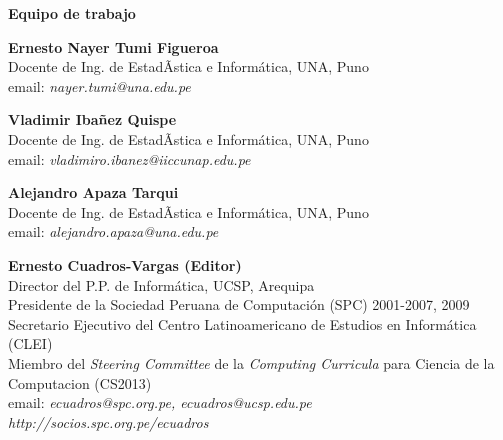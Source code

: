 \begin{center}
{\bf \Huge Equipo de trabajo}
\end{center}
\vspace{1cm}

\begin{center}
\textbf{Ernesto Nayer Tumi Figueroa}\\
Docente de Ing. de EstadÃ­stica e Informática, UNA, Puno\\
email: \textit{nayer.tumi@una.edu.pe}\\
\end{center}

\begin{center}
\textbf{Vladimir Ibañez Quispe}\\
Docente de Ing. de EstadÃ­stica e Informática, UNA, Puno\\
email: \textit{vladimiro.ibanez@iiccunap.edu.pe}\\
\end{center}

\begin{center}
\textbf{Alejandro Apaza Tarqui}\\
Docente de Ing. de EstadÃ­stica e Informática, UNA, Puno\\
email: \textit{alejandro.apaza@una.edu.pe}\\
\end{center}

% 

\begin{center}
\textbf{Ernesto Cuadros-Vargas (Editor)}\\
Director del P.P. de Informática, UCSP, Arequipa\\ %
Presidente de la Sociedad Peruana de Computación (SPC) 2001-2007, 2009\\
Secretario Ejecutivo del Centro Latinoamericano de Estudios en Informática (CLEI)\\
Miembro del {\it Steering Committee} de la {\it Computing Curricula} para Ciencia de la Computacion (CS2013) \\
email: \textit{ecuadros@spc.org.pe, ecuadros@ucsp.edu.pe}\\
\textit{http://socios.spc.org.pe/ecuadros}
\end{center}

